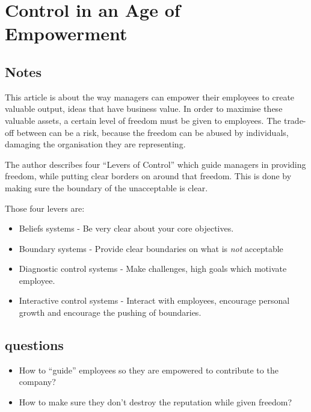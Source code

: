 \chapter{Control in an Age of Empowerment \cite{simons1995control}}
\section{Notes}
This article is about the way managers can empower their employees to create valuable output, ideas that have business value.
In order to maximise these valuable assets, a certain level of freedom must be given to employees. 
The trade-off between can be a risk, because the freedom can be abused by individuals, damaging the organisation they are representing.

The author describes four ``Levers of Control'' which guide managers in providing freedom, while putting clear borders on around that freedom.
This is done by making sure the boundary of the unacceptable is clear.

Those four levers are:
\begin{itemize}
  \item Beliefs systems - Be very clear about your core objectives.
  \item Boundary systems - Provide clear boundaries on what is \emph{not} acceptable
  \item Diagnostic control systems - Make challenges, high goals which motivate employee.
  \item Interactive control systems - Interact with employees, encourage personal growth and encourage the pushing of boundaries.
\end{itemize}

\section{questions}
\begin{itemize}
  \item How to ``guide'' employees so they are empowered to contribute to the company?
  \item How to make sure they don't destroy the reputation while given freedom?
\end{itemize}

